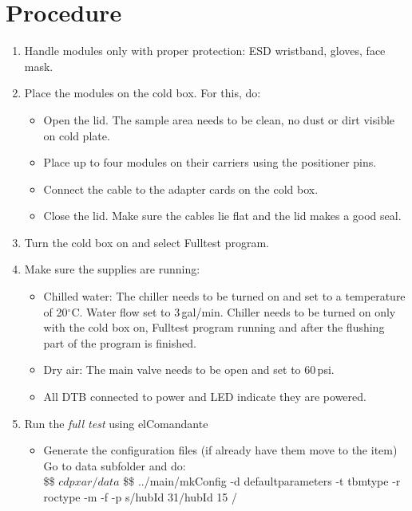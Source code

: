 \documentclass[12pt]{unlsilabsop}
\begin{document}
\section{Procedure}

\begin{enumerate}
    \item Handle modules only with proper protection: ESD wristband, gloves, face mask.
    \item Place the modules on the cold box. For this, do:
    \begin{itemize}
        \item Open the lid. The sample area needs to be clean, no dust or dirt visible on cold plate.
        \item Place up to four modules on their carriers using the positioner pins.
        \item Connect the cable to the adapter cards on the cold box.
        \item Close the lid. Make sure the cables lie flat and the lid makes a good seal.
    \end{itemize}    
    \item Turn the cold box on and select Fulltest program. %
    \item Make sure the supplies are running:
     \begin{itemize}
        \item Chilled water: The chiller needs to be turned on and set to a temperature of 20$^\circ$C. Water flow set to 3\,gal/min. Chiller needs to be turned on only with the cold box on, Fulltest program running and after the flushing part of the program is finished.
        \item Dry air: The main valve needs to be open and set to 60\,psi.
        \item All DTB connected to power and LED indicate they are powered.
    \end{itemize}
    \item Run the \emph{full test} using elComandante 
    \begin{itemize}
		\item Generate the configuration files (if already have them move to the item)\\
		Go to data subfolder and do:\\
		\$\$ $cd pxar/data$
		\$\$ ../main/mkConfig -d defaultparameters -t tbmtype -r roctype -m -f -p \textsc{}s/hubId 31/hubId 15 	\textsc{}/

\end{itemize}
\end{enumerate}
\end{document}
